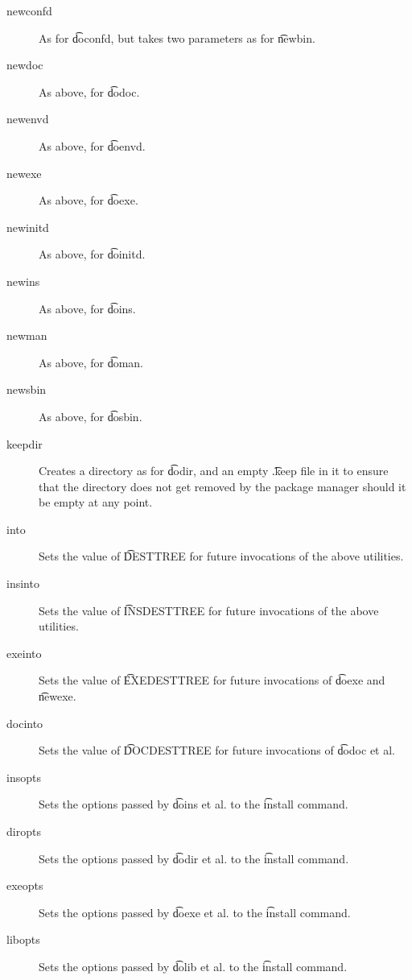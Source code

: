 \begin{description}
\item[newconfd] As for \t{doconfd}, but takes two parameters as for \t{newbin}.

\item[newdoc] As above, for \t{dodoc}.

\item[newenvd] As above, for \t{doenvd}.

\item[newexe] As above, for \t{doexe}.

\item[newinitd] As above, for \t{doinitd}.

\item[newins] As above, for \t{doins}.

\item[newman] As above, for \t{doman}.

\item[newsbin] As above, for \t{dosbin}.

\item[keepdir] Creates a directory as for \t{dodir}, and an empty \t{.keep} file in it to ensure
    that the directory does not get removed by the package manager should it be empty at any point.

\item[into] Sets the value of \t{DESTTREE} for future invocations of the above utilities.

\item[insinto] Sets the value of \t{INSDESTTREE} for future invocations of the above utilities.

\item[exeinto] Sets the value of \t{EXEDESTTREE} for future invocations of \t{doexe} and \t{newexe}.

\item[docinto] Sets the value of \t{DOCDESTTREE} for future invocations of \t{dodoc} et al.

\item[insopts] Sets the options passed by \t{doins} et al. to the \t{install} command.

\item[diropts] Sets the options passed by \t{dodir} et al. to the \t{install} command.

\item[exeopts] Sets the options passed by \t{doexe} et al. to the \t{install} command.

\item[libopts] Sets the options passed by \t{dolib} et al. to the \t{install} command.

\end{description}

